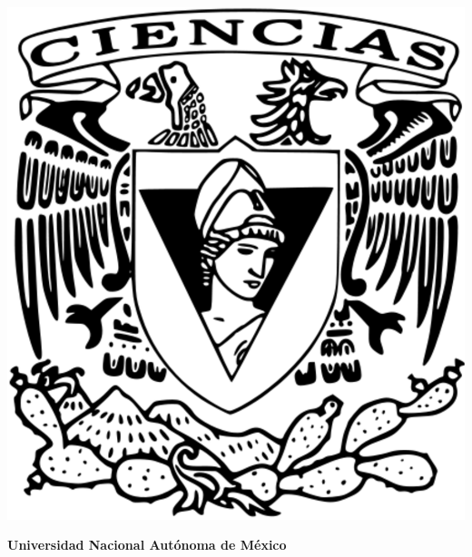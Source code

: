 \documentclass[oneside]{book}
\begin{document}
\begin{titlepage}
\begin{minipage}{10cm}
    \end{minipage}\hfill
    \begin{minipage}{3cm}
    	\begin{center}
    		\includegraphics[height = 0.14\textheight]{recursos/Logo_FC.png}\par
    	\end{center}
    \end{minipage}
        \centering
        \vspace{1cm}
        
        {\bfseries\LARGE Universidad Nacional Autónoma de México \par}
        

\end{titlepage}
\end{document}
